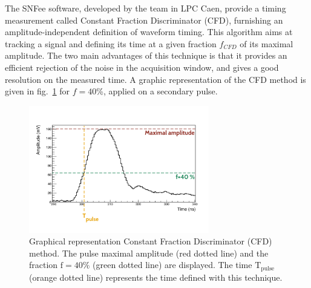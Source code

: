 The SNFee software, developed by the team in LPC Caen, provide a timing measurement called Constant Fraction Discriminator (CFD), furnishing an amplitude-independent definition of waveform timing.
This algorithm aims at tracking a signal and defining its time at a given fraction $f_{CFD}$ of its maximal amplitude.
The two main advantages of this technique is that it provides an efficient rejection of the noise in the acquisition window, and gives a good resolution on the measured time.
A graphic representation of the CFD method is given in fig.~\ref{fig:CFD} for $f=40$\%, applied on a secondary pulse.
\begin{figure}[h!]
  \centering
  \includegraphics[trim={1.2cm 1.5cm 1.7cm 3.1cm},clip,width=0.7\textwidth]{commissioning/fig_commissioning/CFD_example_zoom.pdf}
  \caption{Graphical representation Constant Fraction Discriminator (CFD) method.
    The pulse maximal amplitude (red dotted line) and the fraction $\text{f}=40\%$ (green dotted line) are displayed.
    The time $\text{T}_{\text{pulse}}$ (orange dotted line) represents the time defined with this technique.
    \label{fig:CFD}}
\end{figure}

